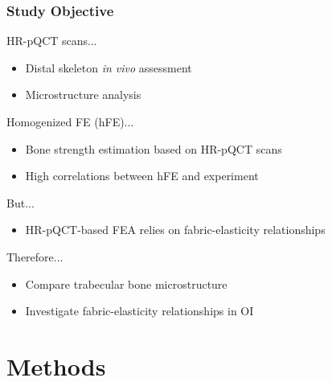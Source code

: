 \documentclass[xcolor=table,11pt]{beamer}
\begin{document}
\begin{frame}
	\frametitle{Study Objective}
	\fontsize{10pt}{10pt}\selectfont
	HR-pQCT scans...
	\begin{itemize}
		\item Distal skeleton \textit{in vivo} assessment
		\item Microstructure analysis
	\end{itemize}\vfill
	Homogenized FE (hFE)...
	\begin{itemize}
		\item Bone strength estimation based on HR-pQCT scans
		\item High correlations between hFE and experiment
	\end{itemize}\vfill
	But...
	\begin{itemize}
		\item HR-pQCT-based FEA relies on fabric-elasticity relationships
	\end{itemize}\vfill
	Therefore...
	\begin{itemize}
		\item Compare trabecular bone microstructure
		\item Investigate fabric-elasticity relationships in OI
	\end{itemize}
\end{frame}




\section{Methods}
\end{document}
